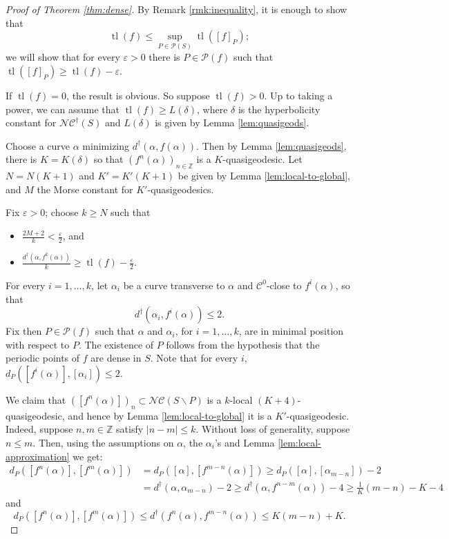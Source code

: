 \documentclass{amsart}
\newcommand{\Z}{\mathbb{Z}}
\newcommand{\Pf}{\mathcal{P}}
\newcommand{\NC}{\mathcal{NC}}
\newcommand{\NCdagger}{\NC^\dagger}
\newcommand{\tl}[1]{\operatorname{tl}(#1)}
\newcommand{\ssm}{\smallsetminus}
\newcommand{\dist}{d}
\newcommand{\distdagger}{d^\dagger}
\theoremstyle{definition}
\begin{document}
\begin{proof}[Proof of Theorem \ref{thm:dense}]
By Remark \ref{rmk:inequality}, it is enough to show that \[\tl{f}\leq \sup_{P\in\Pf(S)}\tl{[f]_{P}};\]
we will show that for every \(\varepsilon>0\) there is \(P\in\Pf(f)\) such that \(\tl{[f]_{P}}\geq \tl{f}-\varepsilon\).

If \(\tl{f}=0\), the result is obvious. So suppose \(\tl{f}>0\). Up to taking a power, we can assume that \(\tl{f}\geq L(\delta)\), where \(\delta\) is the hyperbolicity constant for \(\NCdagger(S)\) and \(L(\delta)\) is given by Lemma \ref{lem:quasigeods}.

Choose a curve \(\alpha\) minimizing \(\distdagger(\alpha,f(\alpha))\). Then by Lemma \ref{lem:quasigeods}, there is \(K=K(\delta)\) so that \((f^n(\alpha))_{n\in \Z}\) is a \(K\)-quasigeodesic. Let \(N=N(K+1)\) and \(K'=K'(K+1)\) be given by Lemma \ref{lem:local-to-global}, and \(M\) the Morse constant for \(K'\)-quasigeodesics.



Fix \(\varepsilon>0\); choose \(k\geq N\) such that
\begin{itemize}
\item \(\frac{2M+2}{k}<\frac{\varepsilon}{2}\), and
\item \(\frac{\distdagger(\alpha,f^k(\alpha))}{k}\geq \tl{f}-\frac{\varepsilon}{2}\).
\end{itemize}

For every \(i=1,\dots, k\), let \(\alpha_i\) be a curve transverse to \(\alpha\) and \(\mathcal{C}^0\)-close to \(f^i(\alpha)\), so that \[\distdagger(\alpha_i,f^i(\alpha))\leq 2.\] 
Fix then \(P\in\Pf(f)\) such that \(\alpha\) and \(\alpha_i\), for \(i=1,\dots, k\), are in minimal position with respect to \(P\). The existence of $P$ follows from the hypothesis that the periodic points of $f$ are dense in $S$.
Note that for every \(i\), \(\dist_P([f^i(\alpha)],[\alpha_i])\leq 2\).

We claim that \(([f^n(\alpha)])_n\subset \NC(S\ssm P)\) is a \(k\)-local \((K+4)\)-quasigeodesic, and hence by Lemma \ref{lem:local-to-global} it is a \(K'\)-quasigeodesic. Indeed, suppose \(n,m\in \Z\) satisfy \(|n-m|\leq k\). Without loss of generality, suppose \(n\leq m\). Then, using the assumptions on \(\alpha\), the \(\alpha_i\)'s and Lemma \ref{lem:local-approximation} we get:
\begin{align*}
\dist_P([f^n(\alpha)],[f^m(\alpha)])& =\dist_P([\alpha],[f^{m-n}(\alpha)])\geq\dist_P([\alpha],[\alpha_{m-n}])-2\\
& =\distdagger(\alpha,\alpha_{m-n})-2\geq \distdagger(\alpha,f^{n-m}(\alpha))-4\geq \frac{1}{K}(m-n)-K-4
\end{align*}
and
\[\dist_P([f^n(\alpha)],[f^m(\alpha)])\leq\distdagger(f^n(\alpha),f^{m-n}(\alpha))\leq K(m-n)+K.\]



\end{proof}
\end{document}
